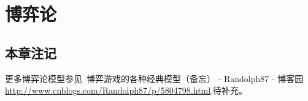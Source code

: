 \chapter{博弈论}



\section{本章注记}
更多博弈论模型参见~博弈游戏的各种经典模型（备忘） - Randolph87 - 博客园
 \url{http://www.cnblogs.com/Randolph87/p/5804798.html},待补充。
